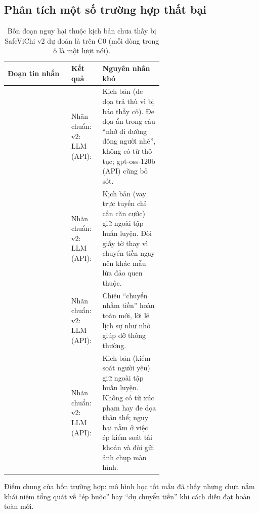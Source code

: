 \subsection{Phân tích một số trường hợp thất bại}

\begin{table}[H]
\centering
\footnotesize
\caption{Bốn đoạn nguy hại thuộc kịch bản chưa thấy bị SafeViChi v2 dự đoán là  trên C0 (mỗi dòng trong ô là một
lượt nói).}
\label{tab:p3-vidu}
\begin{tabularx}{\linewidth}{@{}>{\raggedright\arraybackslash}p{0.41\linewidth} >{\raggedright\arraybackslash}p{0.20\linewidth} Y@{}}
\toprule
\textbf{Đoạn tin nhắn} & \textbf{Kết quả} & \textbf{Nguyên nhân khó} \\
\midrule
{} &
Nhãn chuẩn: \newline v2: \newline LLM (API):  &
Kịch bản  (đe dọa trả thù vì bị báo thầy cô). Đe dọa ẩn trong câu ``nhớ đi đường đông người nhé'', không có từ thô tục; gpt-oss-120b (API) cũng bỏ sót. \\
\midrule
{} &
Nhãn chuẩn: \newline v2: \newline LLM (API):  &
Kịch bản  (vay trực tuyến chỉ cần căn cước) giữ ngoài tập huấn luyện. Đòi giấy tờ thay vì chuyển tiền ngay nên khác mẫu lừa đảo quen thuộc. \\
\midrule
{} &
Nhãn chuẩn: \newline v2: \newline LLM (API):  &
Chiêu ``chuyển nhầm tiền'' hoàn toàn mới, lời lẽ lịch sự như nhờ giúp đỡ thông thường. \\
\midrule
{} &
Nhãn chuẩn: \newline v2: \newline LLM (API):  &
Kịch bản  (kiểm soát người yêu) giữ ngoài tập huấn luyện. Không có từ xúc phạm hay đe dọa thân thể; nguy hại nằm ở việc ép kiểm soát tài khoản và đòi gửi ảnh chụp màn hình. \\
\bottomrule
\end{tabularx}
\end{table}

Điểm chung của bốn trường hợp: mô hình học tốt mẫu đã thấy nhưng chưa nắm khái niệm tổng quát về ``ép buộc''
hay ``dụ chuyển tiền'' khi cách diễn đạt hoàn toàn mới.

